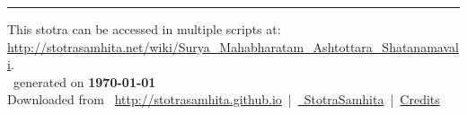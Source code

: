 \documentclass[a5paper,twoside,12pt]{book}
\begin{document}
\setmainfont[Script=Devanagari,Mapping=tex-text]{Sanskrit 2003}
\fontsize {16}{19.25}\selectfont
\let\head\chapt
\begin{center}

\end{center}
\vfill
\centering
\rule{0.8\textwidth}{0.6pt}

\footnotesize
{}\sffamily
This stotra can be accessed in multiple scripts at:\\
\url{http://stotrasamhita.net/wiki/Surya_Mahabharatam_Ashtottara_Shatanamavali}.\\[1ex]
\faFilePdfO~generated on \textbf{\today}\\[1ex]
Downloaded from \faGlobe{}~\url{http://stotrasamhita.github.io}~|~\href{https://github.com/StotraSamhita}{\faGithubSquare{}~StotraSamhita}~|~\href{https://stotrasamhita.github.io/about/}{Credits}
\end{document}
